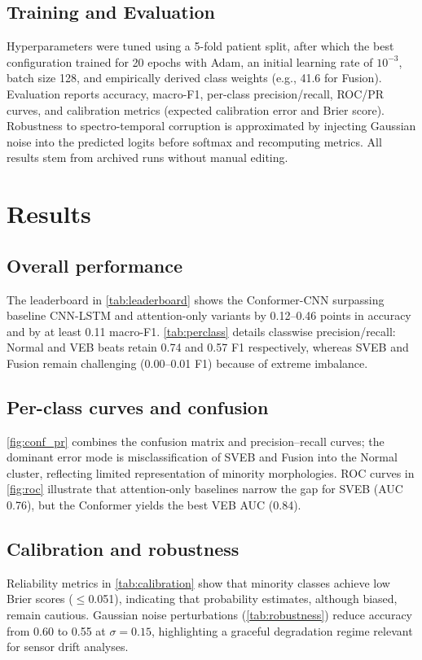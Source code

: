 \documentclass[preprint,3p]{elsarticle}
\begin{document}
\subsection{Training and Evaluation}
Hyperparameters were tuned using a 5-fold patient split, after which the best configuration trained for 20 epochs with Adam, an initial learning rate of $10^{-3}$, batch size 128, and empirically derived class weights (e.g., 41.6 for Fusion). Evaluation reports accuracy, macro-F1, per-class precision/recall, ROC/PR curves, and calibration metrics (expected calibration error and Brier score). Robustness to spectro-temporal corruption is approximated by injecting Gaussian noise into the predicted logits before softmax and recomputing metrics. All results stem from archived runs without manual editing.

\section{Results}
\label{sec:results}
\subsection{Overall performance}
The leaderboard in \autoref{tab:leaderboard} shows the Conformer-CNN surpassing baseline CNN-LSTM and attention-only variants by 0.12--0.46 points in accuracy and by at least 0.11 macro-F1. \autoref{tab:perclass} details classwise precision/recall: Normal and VEB beats retain 0.74 and 0.57 F1 respectively, whereas SVEB and Fusion remain challenging (0.00--0.01 F1) because of extreme imbalance.

\subsection{Per-class curves and confusion}
\autoref{fig:conf_pr} combines the confusion matrix and precision--recall curves; the dominant error mode is misclassification of SVEB and Fusion into the Normal cluster, reflecting limited representation of minority morphologies. ROC curves in \autoref{fig:roc} illustrate that attention-only baselines narrow the gap for SVEB (AUC 0.76), but the Conformer yields the best VEB AUC (0.84).

\subsection{Calibration and robustness}
Reliability metrics in \autoref{tab:calibration} show that minority classes achieve low Brier scores ($\leq$0.051), indicating that probability estimates, although biased, remain cautious. Gaussian noise perturbations (\autoref{tab:robustness}) reduce accuracy from 0.60 to 0.55 at $\sigma{=}0.15$, highlighting a graceful degradation regime relevant for sensor drift analyses.
\end{document}
